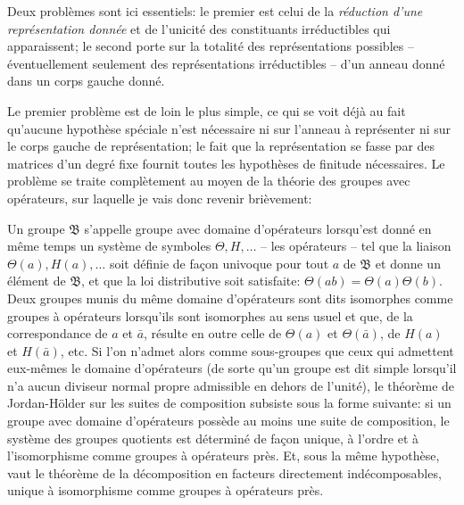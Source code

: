 Deux problèmes sont ici essentiels: le premier est celui de la \emph{réduction d'une représentation donnée} et de l'unicité des constituants irréductibles qui apparaissent; le second porte sur la totalité des représentations possibles -- éventuellement seulement des représentations irréductibles -- d'un anneau donné dans un corps gauche donné.

Le premier problème est de loin le plus simple, ce qui se voit déjà au fait qu'aucune hypothèse spéciale n'est nécessaire ni sur l'anneau à représenter ni sur le corps gauche de représentation; le fait que la représentation se fasse par des matrices d'un degré fixe fournit toutes les hypothèses de finitude nécessaires. Le problème se traite complètement au moyen de la théorie des groupes avec opérateurs, sur laquelle je vais donc revenir brièvement:

Un groupe $\mathfrak{B}$ s'appelle groupe avec domaine d'opérateurs lorsqu'est donné en même temps un système de symboles $\Theta,H,\ldots$ -- les opérateurs -- tel que la liaison $\Theta(a),H(a),\ldots$ soit définie de façon univoque pour tout $a$ de $\mathfrak{B}$ et donne un élément de $\mathfrak{B}$, et que la loi distributive soit satisfaite: $\Theta(ab)=\Theta(a)\Theta(b)$. Deux groupes munis du même domaine d'opérateurs sont dits isomorphes comme groupes à opérateurs lorsqu'ils sont isomorphes au sens usuel et que, de la correspondance de $a$ et $\bar a$, résulte en outre celle de $\Theta(a)$ et $\Theta(\bar a)$, de $H(a)$ et $H(\bar a)$, etc. Si l'on n'admet alors comme sous-groupes que ceux qui admettent eux-mêmes le domaine d'opérateurs (de sorte qu'un groupe est dit simple lorsqu'il n'a aucun diviseur normal propre admissible en dehors de l'unité), le théorème de Jordan-Hölder sur les suites de composition subsiste sous la forme suivante: si un groupe avec domaine d'opérateurs possède au moins une suite de composition, le système des groupes quotients est déterminé de façon unique, à l'ordre et à l'isomorphisme comme groupes à opérateurs près. Et, sous la même hypothèse, vaut le théorème de la décomposition en facteurs directement indécomposables, unique à isomorphisme comme groupes à opérateurs près.

